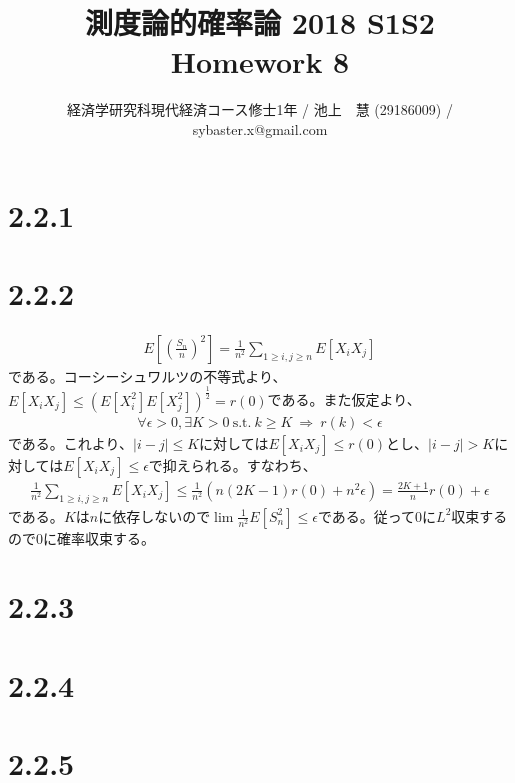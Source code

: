 \documentclass{article}
\begin{document}
\title{測度論的確率論 2018 S1S2 \\ 
Homework 8}
\author{経済学研究科現代経済コース修士1年 / 池上　慧 (29186009) / sybaster.x@gmail.com}
\maketitle

\section{2.2.1}

\section{2.2.2}
\begin{align*}
	E\left[ \left(\frac{S_n}{n}\right)^2 \right] = \frac{1}{n^2} \sum_{1\geq i,j\geq n} E\left[ X_i X_j \right]
\end{align*}
である。コーシーシュワルツの不等式より、$E\left[ X_i X_j \right] \leq \left( E\left[ X_i^2 \right] E\left[ X_j^2 \right] \right)^{\frac{1}{2}} = r(0)$である。また仮定より、
\begin{align*}
	\forall \epsilon > 0, \exists K > 0\ \text{s.t.}\ k \geq K\ \Rightarrow\ r(k) < \epsilon
\end{align*}
である。これより、$|i-j| \leq K$に対しては$E[X_i X_j] \leq r(0)$とし、$|i-j| > K$に対しては$E[X_i X_j] \leq \epsilon$で抑えられる。すなわち、
\begin{align*}
	\frac{1}{n^2} \sum_{1\geq i,j\geq n} E\left[ X_i X_j \right] \leq \frac{1}{n^2} \left( n(2K-1)r(0) + n^2\epsilon \right) = \frac{2K+1}{n}r(0) + \epsilon
\end{align*}
である。$K$は$n$に依存しないので$\lim \frac{1}{n^2} E[S_n^2] \leq \epsilon$である。従って$0$に$L^2$収束するので$0$に確率収束する。

\section{2.2.3}

\section{2.2.4}

\section{2.2.5}
\end{document}
